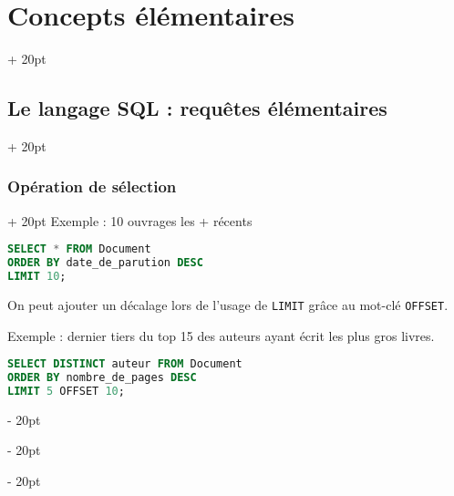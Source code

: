 \documentclass[a4paper, 12pt, twoside]{article}
\newcommand{\ind}[1][20pt]{\advance\leftskip + #1}
\newcommand{\deind}[1][20pt]{\advance\leftskip - #1}
\newenvironment{indt}[2][20pt]{#2 \par \ind[#1]}{\par \deind} %
\begin{document}
\begin{indt}{\section{Concepts élémentaires}}
\begin{indt}{\subsection{Le langage SQL : requêtes élémentaires}}
\begin{indt}{\subsubsection{Opération de sélection}}
                Exemple : 10 ouvrages les + récents

                \begin{lstlisting}[language=SQL, xleftmargin=80pt]
SELECT * FROM Document
ORDER BY date_de_parution DESC
LIMIT 10;
                \end{lstlisting}

                On peut ajouter un décalage lors de l'usage de \texttt{LIMIT} grâce au mot-clé \texttt{OFFSET}.

                Exemple : dernier tiers du top 15 des auteurs ayant écrit les plus gros livres.

                \begin{lstlisting}[language=SQL, xleftmargin=80pt]
SELECT DISTINCT auteur FROM Document
ORDER BY nombre_de_pages DESC
LIMIT 5 OFFSET 10;
                \end{lstlisting}
            \end{indt}
        \end{indt}
        
    \end{indt}

    \vspace{12pt}
    
\end{document}
